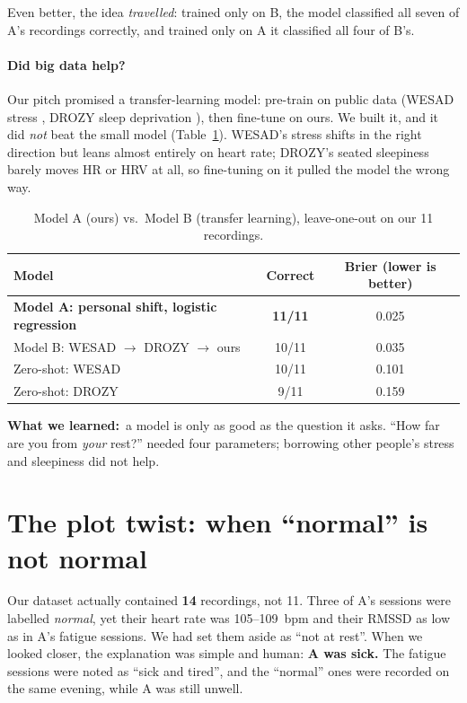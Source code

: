 \documentclass[11pt]{article}
\newcommand{\rowband}{\rowcolors{2}{bblight}{white}}
\newcommand{\lesson}[1]{\begin{lessonbox}\textbf{\color{bbnavy}What we learned:}\ #1\end{lessonbox}}
\begin{document}
Even better, the idea \emph{travelled}: trained only on B, the model classified all seven of A's recordings
correctly, and trained only on A it classified all four of B's.

\paragraph{Did big data help?} Our pitch promised a transfer-learning model: pre-train on public data
(WESAD stress \cite{wesad2018}, DROZY sleep deprivation \cite{drozy2016}), then fine-tune on ours. We built
it, and it did \emph{not} beat the small model (Table~\ref{tab:modelb}). WESAD's stress shifts in the right
direction but leans almost entirely on heart rate; DROZY's seated sleepiness barely moves HR or HRV at all, so
fine-tuning on it pulled the model the wrong way.

\begin{table}[h]
\centering
\caption{Model A (ours) vs.\ Model B (transfer learning), leave-one-out on our 11 recordings.}
\label{tab:modelb}
\rowband\begin{tabular}{lcc}
\toprule
Model & Correct & Brier (lower is better) \\
\midrule
\textbf{Model A: personal shift, logistic regression} & \textbf{11/11} & 0.025 \\
Model B: WESAD $\rightarrow$ DROZY $\rightarrow$ ours & 10/11 & 0.035 \\
Zero-shot: WESAD & 10/11 & 0.101 \\
Zero-shot: DROZY & 9/11 & 0.159 \\
\bottomrule
\end{tabular}
\end{table}

\lesson{a model is only as good as the question it asks. ``How far are you from \emph{your} rest?'' needed
four parameters; borrowing other people's stress and sleepiness did not help.}

\section{The plot twist: when ``normal'' is not normal}

Our dataset actually contained \textbf{14} recordings, not 11. Three of A's sessions were labelled
\emph{normal}, yet their heart rate was 105--109~bpm and their RMSSD as low as in A's fatigue sessions. We
had set them aside as ``not at rest''. When we looked closer, the explanation was simple and human:
\textbf{A was sick.} The fatigue sessions were noted as ``sick and tired'', and the ``normal'' ones were
recorded on the same evening, while A was still unwell.
\end{document}

